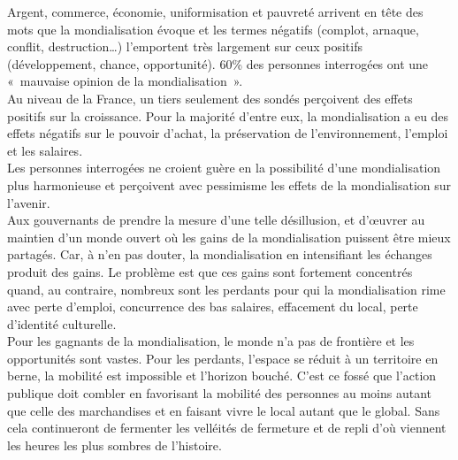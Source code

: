 \documentclass[8pt]{article}
\begin{document}
Argent, commerce, économie, uniformisation et pauvreté arrivent en tête des mots que la mondialisation évoque et les termes négatifs (complot, arnaque, conflit, destruction…) l’emportent très largement sur ceux positifs (développement, chance, opportunité). 60\% des personnes interrogées ont une «\ mauvaise opinion de la mondialisation\ ».\\

Au niveau de la France, un tiers seulement des sondés perçoivent des effets positifs sur la croissance. Pour la majorité d’entre eux, la mondialisation a eu des effets négatifs sur le pouvoir d’achat, la préservation de l’environnement, l’emploi et les salaires. \\

Les personnes interrogées ne croient guère en la possibilité d’une mondialisation plus harmonieuse et perçoivent avec pessimisme les effets de la mondialisation sur l’avenir.\\

Aux gouvernants de prendre la mesure d’une telle désillusion, et d’œuvrer au maintien d’un monde ouvert où les gains de la mondialisation puissent être mieux partagés. Car, à n’en pas douter, la mondialisation en intensifiant les échanges produit des gains. Le problème est que ces gains sont fortement concentrés quand, au contraire, nombreux sont les perdants pour qui la mondialisation rime avec perte d’emploi, concurrence des bas salaires, effacement du local, perte d’identité culturelle.\\

Pour les gagnants de la mondialisation, le monde n’a pas de frontière et les opportunités sont vastes. Pour les perdants, l’espace se réduit à un territoire en berne, la mobilité est impossible et l’horizon bouché. C’est ce fossé que l’action publique doit combler en favorisant la mobilité des personnes au moins autant que celle des marchandises et en faisant vivre le local autant que le global. Sans cela continueront de fermenter les velléités de fermeture et de repli d’où viennent les heures les plus sombres de l’histoire.

\newpage
\end{document}
